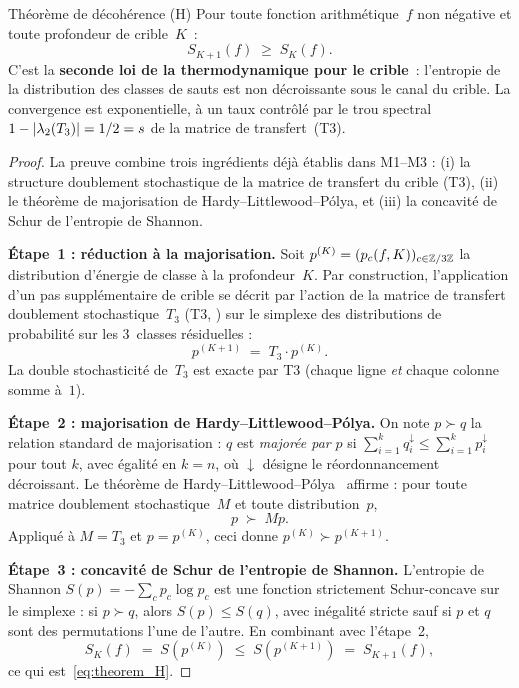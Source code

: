 \documentclass[12pt,a4paper]{article}
\begin{document}
\begin{thmbox}{Théorème de décohérence (H)}\mTHM
\label{thm:theorem_H}
Pour toute fonction arithmétique~$f$ non négative et toute profondeur
de crible~$K$~:
\begin{equation}
  S_{K+1}(f) \;\geq\; S_K(f).
  \label{eq:theorem_H}
\end{equation}
C'est la \textbf{seconde loi de la thermodynamique pour le crible}~:
l'entropie de la distribution des classes de sauts est non
décroissante sous le canal du crible. La convergence est
exponentielle, à un taux contrôlé par le trou spectral
$1 - |\lambda_2(T_3)| = 1/2 = s$ de la matrice de transfert~(T3).
\end{thmbox}

\begin{proof}
La preuve combine trois ingrédients déjà établis dans M1--M3 : (i)
la structure doublement stochastique de la matrice de transfert du
crible (T3), (ii) le théorème de majorisation de
Hardy--Littlewood--Pólya, et (iii) la concavité de Schur de
l'entropie de Shannon.

\textbf{Étape~1 : réduction à la majorisation.}
Soit $p^{(K)} = (p_c(f,K))_{c \in \mathbb{Z}/3\mathbb{Z}}$ la distribution
d'énergie de classe à la profondeur~$K$. Par construction,
l'application d'un pas supplémentaire de crible se décrit par
l'action de la matrice de transfert doublement stochastique~$T_3$
(T3, \cite{companion_M1}) sur le simplexe des distributions de
probabilité sur les $3$~classes résiduelles :
\[
  p^{(K+1)} \;=\; T_3 \cdot p^{(K)}.
\]
La double stochasticité de~$T_3$ est exacte par T3 (chaque ligne
\emph{et} chaque colonne somme à~$1$).

\textbf{Étape~2 : majorisation de Hardy--Littlewood--Pólya.}
On note $p \succ q$ la relation standard de majorisation : $q$ est
\emph{majorée par} $p$ si $\sum_{i=1}^{k} q_i^{\downarrow} \le
\sum_{i=1}^{k} p_i^{\downarrow}$ pour tout $k$, avec égalité en
$k = n$, où $\downarrow$ désigne le réordonnancement décroissant.
Le théorème de Hardy--Littlewood--Pólya~\cite{HLP1934} affirme :
pour toute matrice doublement stochastique~$M$ et toute
distribution~$p$,
\[
  p \;\succ\; M p.
\]
Appliqué à $M = T_3$ et $p = p^{(K)}$, ceci donne
$p^{(K)} \succ p^{(K+1)}$.

\textbf{Étape~3 : concavité de Schur de l'entropie de Shannon.}
L'entropie de Shannon
$S(p) = -\sum_c p_c \log p_c$
est une fonction strictement Schur-concave sur le simplexe : si
$p \succ q$, alors $S(p) \le S(q)$, avec inégalité stricte sauf si
$p$ et $q$ sont des permutations l'une de l'autre. En combinant
avec l'étape~2,
\[
  S_K(f) \;=\; S(p^{(K)}) \;\le\; S(p^{(K+1)}) \;=\; S_{K+1}(f),
\]
ce qui est~\eqref{eq:theorem_H}.


\end{proof}
\end{document}

